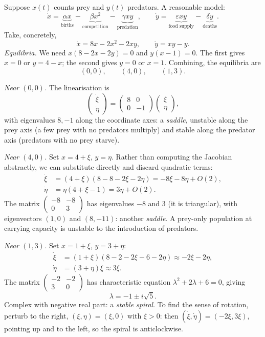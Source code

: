 \begin{example}
	Suppose $x(t)$ counts prey and $y(t)$ predators. A reasonable model:
	$$
	\dot x = \underbrace{\alpha x}_{\text{births}} - \underbrace{\beta x^2}_{\text{competition}} - \underbrace{\gamma xy}_{\text{predation}}, \qquad
	\dot y = \underbrace{\varepsilon xy}_{\text{food supply}} - \underbrace{\delta y}_{\text{deaths}}.
	$$
	Take, concretely,
	$$
	\dot x = 8x - 2x^2 - 2xy, \qquad \dot y = xy - y.
	$$
	\emph{Equilibria.} We need $x(8 - 2x - 2y) = 0$ and $y(x - 1) = 0$. The first gives $x = 0$ or $y = 4 - x$; the second gives $y = 0$ or $x = 1$. Combining, the equilibria are
	$$
	(0, 0), \qquad (4, 0), \qquad (1, 3).
	$$

	\emph{Near $(0,0)$.} The linearisation is
	$$
	\begin{pmatrix} \dot\xi \\ \dot\eta \end{pmatrix} = \begin{pmatrix} 8 & 0 \\ 0 & -1 \end{pmatrix}\begin{pmatrix} \xi \\ \eta\end{pmatrix},
	$$
	with eigenvalues $8, -1$ along the coordinate axes: a \emph{saddle}, unstable along the prey axis (a few prey with no predators multiply) and stable along the predator axis (predators with no prey starve).

	\emph{Near $(4, 0)$.} Set $x = 4 + \xi$, $y = \eta$. Rather than computing the Jacobian abstractly, we can substitute directly and discard quadratic terms:
	\begin{align*}
		\dot \xi &= (4 + \xi)(8 - 8 - 2\xi - 2\eta) = -8\xi - 8\eta + O(2), \\
		\dot \eta &= \eta(4 + \xi - 1) = 3\eta + O(2).
	\end{align*}
	The matrix $\begin{pmatrix} -8 & -8 \\ 0 & 3 \end{pmatrix}$ has eigenvalues $-8$ and $3$ (it is triangular), with eigenvectors $(1, 0)$ and $(8, -11)$: another \emph{saddle}. A prey-only population at carrying capacity is unstable to the introduction of predators.

	\emph{Near $(1, 3)$.} Set $x = 1 + \xi$, $y = 3 + \eta$:
	\begin{align*}
		\dot\xi &= (1 + \xi)(8 - 2 - 2\xi - 6 - 2\eta) \approx -2\xi - 2\eta, \\
		\dot\eta &= (3 + \eta)\xi \approx 3\xi.
	\end{align*}
	The matrix $\begin{pmatrix} -2 & -2 \\ 3 & 0\end{pmatrix}$ has characteristic equation $\lambda^2 + 2\lambda + 6 = 0$, giving
	$$
	\lambda = -1 \pm i \sqrt 5.
	$$
	Complex with negative real part: a \emph{stable spiral}. To find the sense of rotation, perturb to the right, $(\xi, \eta) = (\xi, 0)$ with $\xi > 0$: then $(\dot \xi, \dot\eta) = (-2\xi, 3\xi)$, pointing up and to the left, so the spiral is anticlockwise.


\end{example}
